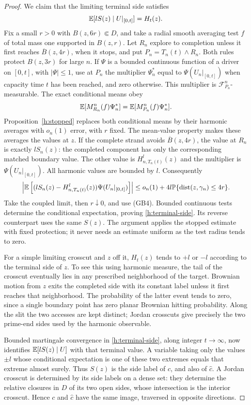 \begin{proof}
We claim that the limiting terminal side satisfies
\begin{equation}\label{h:terminal-side}
 \mathbb E[lS(z)\mid U|_{[0,t]}]=H_t(z).
\end{equation}
Fix a small $r>0$ with $B(z,6r)\Subset D$, and take a radial smooth
averaging test $f$ of total mass one supported in $B(z,r)$.
Let $R_n$ explore to completion unless it first reaches
$\overline B(z,4r)$, when it stops, and put $P_n=T_n(t)\wedge R_n$.
Both rules protect $B(z,3r)$ for large $n$. If $\Psi$ is a bounded
continuous function of a driver on $[0,t]$, with $|\Psi|\le1$, use
at $P_n$ the multiplier $\Psi_n^*$ equal to
$\Psi(U_n|_{[0,t]})$ when capacity time $t$ has been reached, and zero
otherwise. This multiplier is $\mathcal F^n_{P_n}$-measurable. The
exact conditional means obey
\[
 \mathbb E[M^n_{R_n}(f)\Psi_n^*]=\mathbb E[M^n_{P_n}(f)\Psi_n^*].
\]
Proposition~\ref{h:stopped} replaces both conditional means by their
harmonic averages with $o_n(1)$ error, with $r$ fixed. The mean-value
property makes these averages the values at $z$. If the complete
strand avoids $\overline B(z,4r)$, the value at $R_n$ is exactly
$lS_n(z)$: the completed component has only the corresponding matched
boundary value. The other value is $H^l_{n,T_n(t)}(z)$ and the multiplier
is $\Psi(U_n|_{[0,t]})$. All harmonic values are bounded by $l$.
Consequently
\[
 \left|\mathbb E\left[(lS_n(z)-H^l_{n,T_n(t)}(z))
              \Psi(U_n|_{[0,t]})\right]\right|
 \le o_n(1)+4l\mathbb P\{\operatorname{dist}(z,\gamma_n)\le4r\}.
\]
Take the coupled limit, then $r\downarrow0$, and use \textup{(GB4)}.
Bounded continuous tests determine the conditional expectation, proving
\eqref{h:terminal-side}. Its reverse counterpart uses the same $S(z)$.
The argument applies the stopped estimate with fixed protection; it
never needs an estimate uniform as the test radius tends to zero.

For a simple limiting crosscut and $z$ off it, $H_t(z)$ tends to $+l$
or $-l$ according to the terminal side of $z$. To see this using
harmonic measure, the tail of the crosscut eventually lies in any
prescribed neighborhood of the target. Brownian motion from $z$
exits the completed side with its constant label unless it first
reaches that neighborhood. The probability of the latter event tends
to zero, since a single boundary point has zero planar Brownian hitting
probability. Along the slit the two accesses are kept distinct;
Jordan crosscuts give precisely the two prime-end sides used by the
harmonic observable.

Bounded martingale convergence in \eqref{h:terminal-side}, along integer
$t\to\infty$, now identifies $\mathbb E[lS(z)\mid U]$ with that terminal
value. A variable taking only the values $\pm l$ whose conditional
expectation is one of these two extremes equals that extreme almost
surely. Thus $S(z)$ is the side label of $c$, and also of $\widehat c$.
A Jordan crosscut is determined by its side labels on a dense set:
they determine the relative closures in $D$ of its two open sides,
whose intersection is the interior crosscut. Hence $c$ and
$\widehat c$ have the same image, traversed in opposite directions.


\end{proof}
